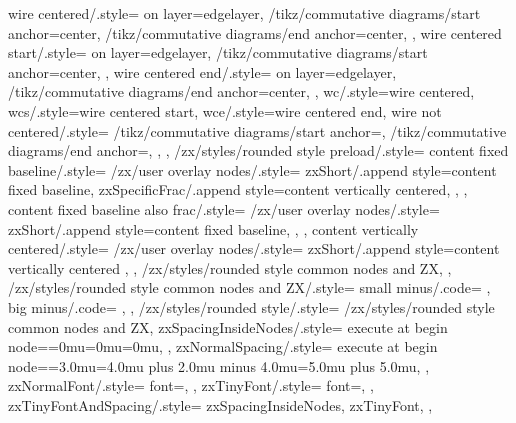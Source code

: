 {{    %
    wire centered/.style={
      on layer=edgelayer,
      /tikz/commutative diagrams/start anchor=center,
      /tikz/commutative diagrams/end anchor=center,
    },
    wire centered start/.style={
      on layer=edgelayer,
      /tikz/commutative diagrams/start anchor=center,
    },
    wire centered end/.style={
      on layer=edgelayer,
      /tikz/commutative diagrams/end anchor=center,
    },
    wc/.style={wire centered},
    wcs/.style={wire centered start},
    wce/.style={wire centered end},
    wire not centered/.style={
      /tikz/commutative diagrams/start anchor=,
      /tikz/commutative diagrams/end anchor=,
    },
  },
  /zx/styles/rounded style preload/.style={
    content fixed baseline/.style={
      /zx/user overlay nodes/.style={
        zxShort/.append style={content fixed baseline},
        zxSpecificFrac/.append style={content vertically centered},
      },
    },
    content fixed baseline also frac/.style={
      /zx/user overlay nodes/.style={
        zxShort/.append style={content fixed baseline},
      },
    },
    content vertically centered/.style={
      /zx/user overlay nodes/.style={
        zxShort/.append style={content vertically centered}
      },
    },
    /zx/styles/rounded style common nodes and ZX,
  },
  /zx/styles/rounded style common nodes and ZX/.style={
    small minus/.code={
      \def\zxMinus{\zxShortMinus}%
      \def\zxMinusInShort{\zxShortMinus}%
    },
    big minus/.code={
      \def\zxMinus{-}%
      \def\zxMinusInShort{-}%
    },
  },
  /zx/styles/rounded style/.style={
    /zx/styles/rounded style common nodes and ZX,
    zxSpacingInsideNodes/.style={
      execute at begin node={\thinmuskip=0mu\medmuskip=0mu\thickmuskip=0mu}, %
    },
    zxNormalSpacing/.style={
      execute at begin node={\thinmuskip=3.0mu\medmuskip=4.0mu plus 2.0mu minus 4.0mu\thickmuskip=5.0mu plus 5.0mu}, %
    },
    zxNormalFont/.style={
      font={\fontsize{10}{12}\selectfont},
    },
    zxTinyFont/.style={
      font={\fontsize{6}{6}\selectfont},
    },
    zxTinyFontAndSpacing/.style={
      zxSpacingInsideNodes,
      zxTinyFont,
    },
}}
